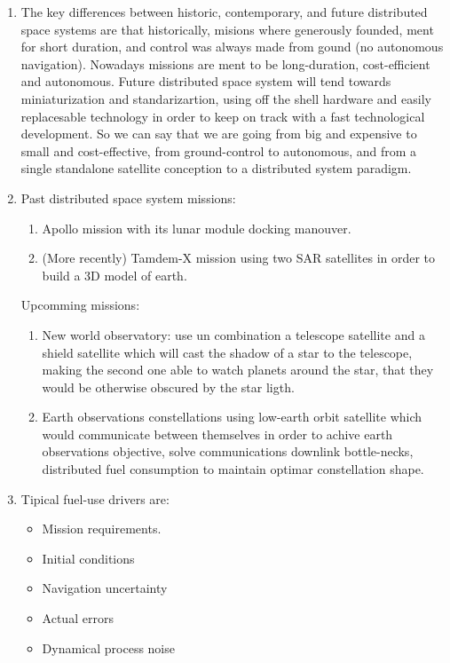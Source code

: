 \documentclass[a4paper]{article}
\begin{document}
\begin{enumerate}[label=\emph{\alph*)},series=preguntas1_1]
  \item %
    The key differences between historic, contemporary, and future distributed space systems are that historically, misions where generously founded, ment for short duration, and control was always made from gound (no autonomous navigation). Nowadays missions are ment to be long-duration, cost-efficient and autonomous. Future distributed space system will tend towards miniaturization and standarizartion, using off the shell hardware and easily replacesable technology in order to keep on track with a fast technological development. So we can say that we are going from big and expensive to small and cost-effective, from ground-control to autonomous, and from a single standalone satellite conception to a distributed system paradigm.

  \item %
    Past distributed space system missions:
    \begin{enumerate}[label=\arabic*., series=pregunta4]
      \item Apollo mission with its lunar module docking manouver.
      \item (More recently) Tamdem-X mission using two SAR satellites in order to build a 3D model of earth.
    \end{enumerate}

    Upcomming missions:
    \begin{enumerate}[resume*=pregunta4]
      \item New world observatory: use un combination a telescope satellite and a shield satellite which will cast the shadow of a star to the telescope, making the second one able to watch planets around the star, that they would be otherwise obscured by the star ligth.
      \item Earth observations constellations using low-earth orbit satellite which would communicate between themselves in order to achive earth observations objective, solve communications downlink bottle-necks, distributed fuel consumption to maintain optimar constellation shape.
    \end{enumerate}

  \item %
    Tipical fuel-use drivers are:
  \begin{itemize}
    \item Mission requirements.
    \item Initial conditions
    \item Navigation uncertainty
    \item Actual errors
    \item Dynamical process noise
  \end{itemize}


\end{enumerate}
\end{document}

